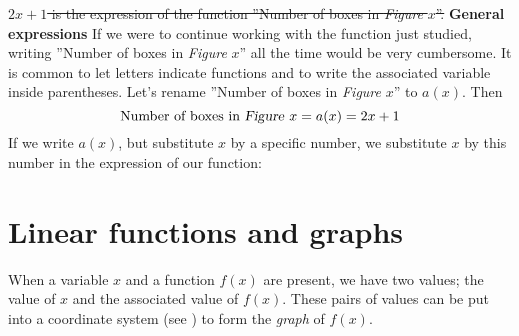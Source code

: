 \st{$ {2x+1} $ is the expression of the function ''Number of boxes in \textsl{Figure }$ x $''.}
\newpage
\textbf{General expressions} \os
If we were to continue working with the function just studied, writing ''Number of boxes in \textsl{Figure }$ x $'' all the time would be very cumbersome. It is common to let letters indicate functions and to write the associated variable inside parentheses. Let's rename ''Number of boxes in \textsl{Figure} $ x $'' to $ a(x) $. Then
\[ \text{Number of boxes in \textsl{Figure }}x=a(x)=2x+1 \]
If we write $ a(x) $, but substitute $ x $ by a specific number, we substitute $ x $ by this number in the expression of our function:
\newpage
{}
\section{Linear functions and graphs}
When a variable $ x $ and a function $ f(x)  $ are present, we have two values; the value of $ x $ and the associated value of $ f(x) $. These pairs of values can be put into a coordinate system (see ) to form the  \textit{graph} of $ f(x) $. \vsk

